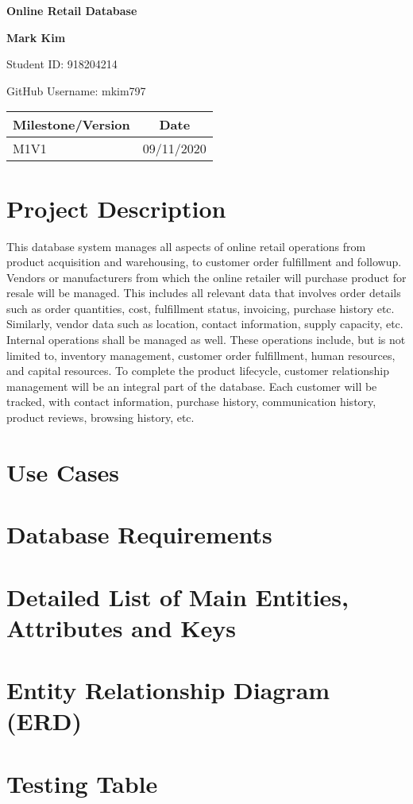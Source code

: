 \documentclass{article}
\begin{document}
\begin{titlepage}
\begin{center}
	\vspace*{1cm}
	\Huge
	\textbf{Online Retail Database}
	
	\vspace{1.5cm}
	\LARGE
	\textbf{Mark Kim}
	
	\Large
	Student ID: 918204214
	
	GitHub Username: mkim797
	
	\large
	\vspace{1cm}
	\begin{tabular}{ | l | c | }
		\hline
		\textbf{Milestone/Version} & \textbf{Date}\\
		\hline
		M1V1 & 09/11/2020\\
		\hline
	\end{tabular}

\end{center}
\end{titlepage}

\tableofcontents
\pagebreak

\section{Project Description}
This database system manages all aspects of online retail operations from product acquisition and warehousing, to customer order fulfillment and followup.  Vendors or manufacturers from which the online retailer will purchase product for resale will be managed.  This includes all relevant data that involves order details such as order quantities, cost, fulfillment status, invoicing, purchase history etc.  Similarly, vendor data such as location, contact information, supply capacity, etc.  Internal operations shall be managed as well.  These operations include, but is not limited to, inventory management, customer order fulfillment, human resources, and capital resources.  To complete the product lifecycle, customer relationship management will be an integral part of the database.  Each customer will be tracked, with contact information, purchase history, communication history, product reviews, browsing history, etc.

\section{Use Cases}

\section{Database Requirements}

\section{Detailed List of Main Entities, Attributes and Keys}

\section{Entity Relationship Diagram (ERD)}

\section{Testing Table}
\end{document}
